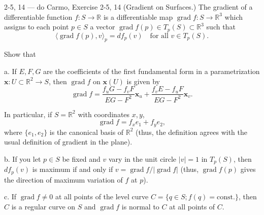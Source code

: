 \begin{exercise}{2-5, 14 — do Carmo, Exercise 2-5, 14}
(Gradient on Surfaces.) The gradient of a differentiable function $f: S \to \mathbb{R}$ is a differentiable map $\operatorname{grad} f: S \to \mathbb{R}^3$ which assigns to each point $p \in S$ a vector $\operatorname{grad} f(p) \in T_p(S) \subset \mathbb{R}^3$ such that
\[
\langle \operatorname{grad} f(p), v \rangle_p = df_p(v) \quad \text{for all } v \in T_p(S).
\]

Show that

a. If $E, F, G$ are the coefficients of the first fundamental form in a parametrization $\mathbf{x}: U \subset \mathbb{R}^2 \to S$, then $\operatorname{grad} f$ on $\mathbf{x}(U)$ is given by
\[
\operatorname{grad} f = \frac{f_u G - f_v F}{EG - F^2} \mathbf{x}_u + \frac{f_v E - f_u F}{EG - F^2} \mathbf{x}_v.
\]

In particular, if $S = \mathbb{R}^2$ with coordinates $x, y$,
\[
\operatorname{grad} f = f_x e_1 + f_y e_2,
\]
where $\{e_1, e_2\}$ is the canonical basis of $\mathbb{R}^2$ (thus, the definition agrees with the usual definition of gradient in the plane).

b. If you let $p \in S$ be fixed and $v$ vary in the unit circle $|v| = 1$ in $T_p(S)$, then $df_p(v)$ is maximum if and only if $v = \operatorname{grad} f / |\operatorname{grad} f|$ (thus, $\operatorname{grad} f(p)$ gives the direction of maximum variation of $f$ at $p$).

c. If $\operatorname{grad} f \neq 0$ at all points of the level curve $C = \{q \in S; f(q) = \mathrm{const.}\}$, then $C$ is a regular curve on $S$ and $\operatorname{grad} f$ is normal to $C$ at all points of $C$.
\end{exercise}

